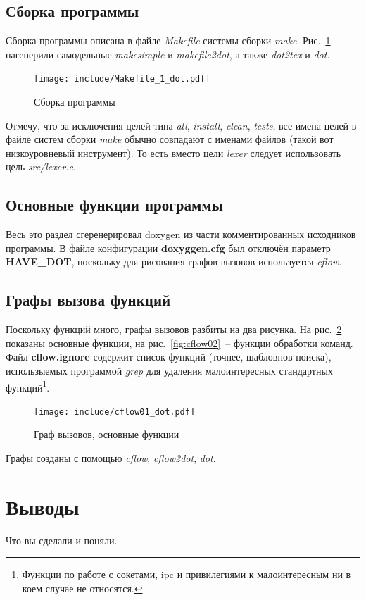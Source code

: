 \documentclass[a4paper,12pt]{report}
\begin{document}
\section{Сборка программы}

Сборка программы описана в файле \textit{Makefile} системы сборки \textit{make}. Рис.~\ref{fig:make} нагенерили самодельные \textit{makesimple} и \textit{makefile2dot}, а также \textit{dot2tex} и \textit{dot}.

\begin{figure}
\centering
\texttt{[image: include/Makefile\_1\_dot.pdf]}
\caption{Сборка программы}
\label{fig:make}
\end{figure}

Отмечу, что за исключения целей типа \textit{all}, \textit{install}, \textit{clean}, \textit{tests}, все имена целей в файле систем сборки \textit{make} обычно совпадают с именами файлов (такой вот низкоуровневый инструмент). То есть вместо цели \textit{lexer} следует использовать цель \textit{src/lexer.c}.

\section{Основные функции программы}

Весь это раздел сгеренерировал doxygen из части комментированных исходников программы. В файле конфигурации \textbf{doxyggen.cfg} был отключён параметр \textbf{HAVE\_DOT}, поскольку для рисования графов вызовов используется \textit{cflow}.

%
%
%
%
%
%
%
%

\section{Графы вызова функций}

Поскольку функций много, графы вызовов разбиты на два рисунка. На рис.~\ref{fig:cflow01} показаны основные функции, на рис.~\ref{fig:cflow02}~-- функции обработки команд. Файл \textbf{cflow.ignore} содержит список функций (точнее, шабловнов поиска), использыемых программой \textit{grep} для удаления малоинтересных стандартных функций\footnote{Функции по работе с сокетами, ipc и привилегиями к малоинтересным ни в коем случае не относятся.}.

\begin{figure}
\centering
\texttt{[image: include/cflow01\_dot.pdf]}
\caption{Граф вызовов, основные функции}
\label{fig:cflow01}
\end{figure}

Графы созданы с помощью \textit{cflow}, \textit{cflow2dot}, \textit{dot}.

\chapter*{Выводы}

Что вы сделали и поняли.
\end{document}
